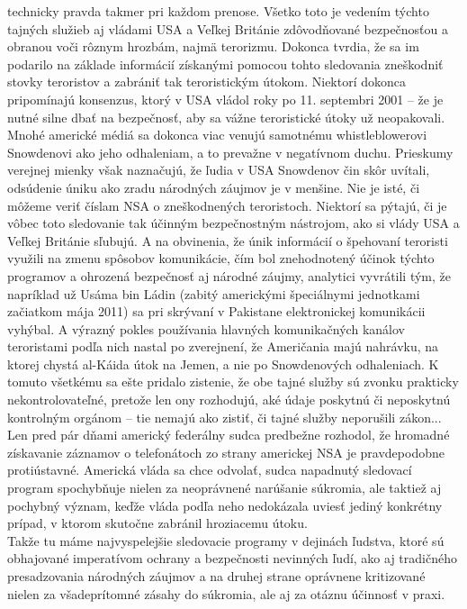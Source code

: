 \documentclass{article}
\begin{document}
\begin{flushleft}
technicky pravda takmer pri každom prenose. Všetko toto je vedením týchto tajných služieb aj vládami USA a Veľkej Británie zdôvodňované bezpečnosťou a obranou voči rôznym hrozbám, najmä terorizmu. Dokonca tvrdia, že sa im podarilo na základe informácií získanými pomocou tohto sledovania zneškodniť stovky teroristov a zabrániť tak teroristickým útokom. Niektorí dokonca pripomínajú konsenzus, ktorý v USA vládol roky po 11. septembri 2001 – že je nutné silne dbať na bezpečnosť, aby sa vážne teroristické útoky už neopakovali. Mnohé americké médiá sa dokonca viac venujú samotnému whistleblowerovi Snowdenovi ako jeho odhaleniam, a to prevažne v negatívnom duchu. Prieskumy verejnej mienky však naznačujú, že ľudia v USA Snowdenov čin skôr uvítali, odsúdenie úniku ako zradu národných záujmov je v menšine. Nie je isté, či môžeme veriť číslam NSA o zneškodnených teroristoch. Niektorí sa pýtajú, či je vôbec toto sledovanie tak účinným bezpečnostným nástrojom, ako si vlády USA a Veľkej Británie sľubujú. A na obvinenia, že únik informácií o špehovaní teroristi využili na zmenu spôsobov komunikácie, čím bol znehodnotený účinok týchto programov a ohrozená bezpečnosť aj národné záujmy, analytici vyvrátili tým, že napríklad už Usáma bin Ládin (zabitý americkými špeciálnymi jednotkami začiatkom mája 2011) sa pri skrývaní v Pakistane elektronickej komunikácii vyhýbal. A výrazný pokles používania hlavných komunikačných kanálov teroristami podľa nich nastal po zverejnení, že Američania majú nahrávku, na ktorej chystá al-Káida útok na Jemen, a nie po Snowdenových odhaleniach. K tomuto všetkému sa ešte pridalo zistenie, že obe tajné služby sú zvonku prakticky nekontrolovateľné, pretože len ony rozhodujú, aké údaje poskytnú či neposkytnú kontrolným orgánom – tie nemajú ako zistiť, či tajné služby neporušili zákon... Len pred pár dňami americký federálny sudca predbežne rozhodol, že hromadné získavanie záznamov o telefonátoch zo strany americkej NSA je pravdepodobne protiústavné. Americká vláda sa chce odvolať, sudca napadnutý sledovací program spochybňuje nielen za neoprávnené narúšanie súkromia, ale taktiež aj pochybný význam, keďže vláda podľa neho nedokázala uviesť jediný konkrétny prípad, v ktorom skutočne zabránil hroziacemu útoku.\\
Takže tu máme najvyspelejšie sledovacie programy v dejinách ľudstva, ktoré sú obhajované imperatívom ochrany a bezpečnosti nevinných ľudí, ako aj tradičného presadzovania národných záujmov a na druhej strane oprávnene kritizované nielen za všadeprítomné zásahy do súkromia, ale aj za otáznu účinnosť v praxi.\\


\end{flushleft}
\end{document}
